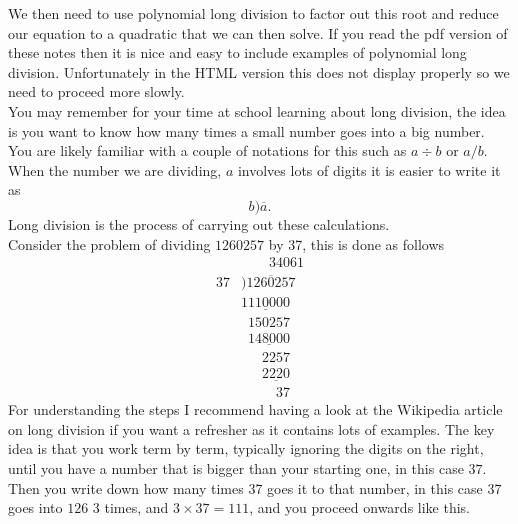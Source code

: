 \begin{warpHTML}
We then need to use polynomial long division to factor out this root and reduce our equation to a quadratic that we can then solve. If you read the pdf version of these notes then it is nice and easy to include examples of polynomial long division. Unfortunately in the HTML version this does not display properly so we need to proceed more slowly.\\

You may remember for your time at school learning about long division, the idea is you want to know how many times a small number goes into a big number. You are likely familiar with a couple of notations for this such as $a\div b$ or $a/b$.  When the number we are dividing, $a$ involves lots of digits it is easier to write it as
\begin{equation*}
b)\overline{a}.
\end{equation*}
Long division is the process of carrying out these calculations.\\

Consider the problem of dividing $1260257$ by 37, this is done as follows
\begin{align*}
& \phantom{++}34061\\
37&)\overline{1260257}\\
&\underline{1110000}\\
&\phantom{1}150257\\
&\phantom{1}\underline{148000}\\
&\phantom{111}2257\\
&\phantom{111}\underline{2220}\\
&\phantom{11111}37
\end{align*}
For understanding the steps I recommend having a look at the Wikipedia article on long division if you want a refresher as it contains lots of examples. The key idea is that you work term by term, typically ignoring the digits on the right, until you have a number that is bigger than your starting one, in this case $37$. Then you write down how many times 37 goes it to that number, in this case $37$ goes into $126$ $3$ times, and $3\times 37=111$, and you proceed onwards like this.\\


\end{warpHTML}
